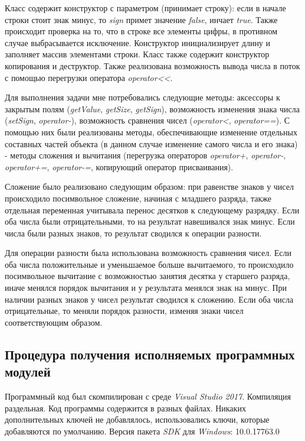 \documentclass[a4paper,14pt]{article}
\begin{document}
Класс содержит конструктор с параметром (принимает строку): если в начале строки стоит знак минус, то \textit{sign} примет значение \textit{false}, инчает \textit{true}. Также происходит проверка на то, что в строке все элементы цифры, в противном случае выбрасывается исключение. Конструктор инициализирует длину и заполняет массив элементами строки. Класс также содержит конструктор копирования и деструктор. Также реализована возможность вывода числа в поток с помощью перегрузки оператора \textit{operator<<}.

Для выполнения задачи мне потребовались следующие методы: аксессоры к закрытым полям (\textit{getValue}, \textit{getSize}, \textit{getSign}), возможность изменения знака числа (\textit{setSign}, \textit{operator-}), возможность сравнения чисел (\textit{operator<}, \textit{operator==}). С помощью них были реализованы методы, обеспечивающие изменение отдельных составных частей объекта (в данном случае изменение самого числа и его знака) - методы сложения и вычитания (перегрузка операторов \textit{operator+},  \textit{operator-}, \textit{operator+=}, \textit{operator-=}, копирующий оператор присваивания). 

Сложение было реализовано следующим образом: при равенстве знаков у чисел происходило посимвольное сложение, начиная с младшего разряда, также отдельная переменная учитывала перенос десятков к следующему разрядку. Если оба числа были отрицательными, то на результат навешивался знак минус. Если числа были разных знаков, то результат сводился к операции разности.

Для операции разности была использована возможность сравнения чисел. Если оба числа положительные и уменьшаемое больше вычитаемого, то происходило посимвольное вычитание с возможностью занятия десятка у старшего разряда, иначе менялся порядок вычитания и у результата менялся знак на минус. При наличии разных знаков у чисел результат сводился к сложению. Если оба числа отрицательные, то меняли порядок разности, изменяя знаки чисел соответствующим образом.

\subsection{Процедура получения исполняемых программных модулей}
Программный код был скомпилирован с среде \textit{Visual Studio 2017}. Компиляция раздельная. Код программы содержится в разных файлах. Никаких дополнительных ключей не добавлялось, использовались ключи, которые добавляются по умолчанию. Версия пакета \textit{SDK} для \textit{Windows}: 10.0.17763.0
\end{document}
